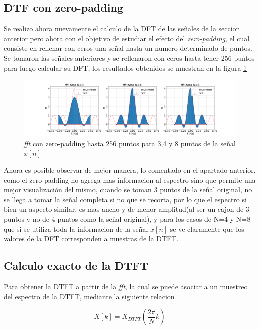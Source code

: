 \documentclass[letterpaper]{article}
\begin{document}
    \subsection{DTF con zero-padding}
    Se realizo ahora nuevamente el calculo de la DFT de las señales de la seccion anterior pero ahora con el objetivo de estudiar el efecto del \textit{zero-padding}, el cual consiste en rellenar con ceros una señal hasta un numero determinado de puntos. Se tomaron las señales anteriores y se rellenaron con ceros hasta tener 256 puntos para luego calcular su DFT, los resultados obtenidos se muestran en la figura \ref{fig.1c}
    \begin{figure}[htb]
    \centering
    \includegraphics[width=\textwidth]{Img/punto_3_c.png}
    \caption{\textit{fft} con zero-padding hasta 256 puntos para 3,4 y 8 puntos de la señal $x[n]$}
    \label{fig.1c}
    \end{figure}
    Ahora es posible observar de mejor manera, lo comentado en el apartado anterior, como el zero-padding no agrega mas informacion al espectro sino que permite una mejor visualización del mismo, cuando se toman 3 puntos de la señal original, no se llega a tomar la señal completa si no que se recorta, por lo que el espectro si bien un aspecto similar, es mas ancho y de menor amplitud(al ser un cajon de 3 puntos y no de 4 puntos como la señal original), y para los casos de N=4 y N=8 que si se utiliza toda la informacion de la señal $x[n]$ se ve claramente que los valores de la DFT corresponden a muestras de la DTFT.


    \subsection{Calculo exacto de la DTFT}

        Para obtener la DTFT a partir de la \textit{fft}, la cual se puede asociar a un muestreo del espectro
        de la DTFT, mediante la siguiente relacion 

        \begin{equation}
            X[k]=X_{DTFT}\left(  \frac{2 \pi}{N} k \right)
        \end{equation}
\end{document}
